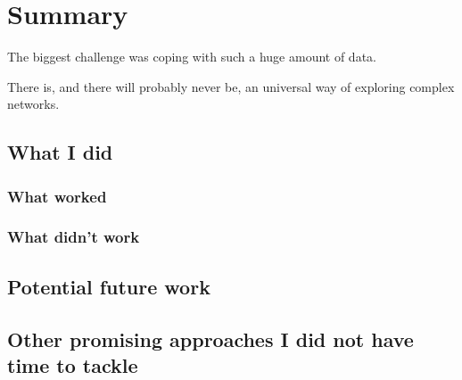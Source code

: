 \chapter{Summary}
  
  The biggest challenge was coping with such a huge amount of data.
  
  There is, and there will probably never be, an universal way of exploring complex networks.

	\section{What I did}
		\subsection{What worked}
	
		\subsection{What didn't work}
	
	\section{Potential future work}
	
	\section{Other promising approaches I did not have time to tackle}
	
